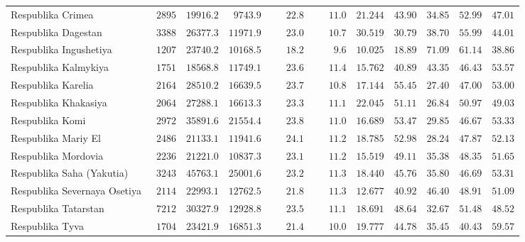 \documentclass[12pt,a4paper]{article}
\numberwithin{equation}{section}
\begin{document}
{\begin{longtable}{lcccccccccc}
		Respublika Crimea  & $\phantom{0}2895$ & $19916.2$ & $\phantom{0}9743.9$ & $\phantom{000}22.8$ & $\phantom{000}11.0$ & $21.244$ & $43.90$ & $34.85$ & $52.99$ & $47.01$ \\
		Respublika Dagestan  & $\phantom{0}3388$ & $26377.3$ & $11971.9$ & $\phantom{000}23.0$ & $\phantom{000}10.7$ & $30.519$ & $30.79$ & $38.70$ & $55.99$ & $44.01$ \\
		Respublika Ingushetiya  & $\phantom{0}1207$ & $23740.2$ & $10168.5$ & $\phantom{000}18.2$ & $\phantom{0000}9.6$ & $10.025$ & $18.89$ & $71.09$ & $61.14$ & $38.86$ \\
		Respublika Kalmykiya  & $\phantom{0}1751$ & $18568.8$ & $11749.1$ & $\phantom{000}23.6$ & $\phantom{000}11.4$ & $15.762$ & $40.89$ & $43.35$ & $46.43$ & $53.57$ \\
		Respublika Karelia  & $\phantom{0}2164$ & $28510.2$ & $16639.5$ & $\phantom{000}23.7$ & $\phantom{000}10.8$ & $17.144$ & $55.45$ & $27.40$ & $47.00$ & $53.00$ \\
		Respublika Khakasiya  & $\phantom{0}2064$ & $27288.1$ & $16613.3$ & $\phantom{000}23.3$ & $\phantom{000}11.1$ & $22.045$ & $51.11$ & $26.84$ & $50.97$ & $49.03$ \\
		Respublika Komi  & $\phantom{0}2972$ & $35891.6$ & $21554.4$ & $\phantom{000}23.8$ & $\phantom{000}11.0$ & $16.689$ & $53.47$ & $29.85$ & $46.67$ & $53.33$ \\
		Respublika Mariy El  & $\phantom{0}2486$ & $21133.1$ & $11941.6$ & $\phantom{000}24.1$ & $\phantom{000}11.2$ & $18.785$ & $52.98$ & $28.24$ & $47.87$ & $52.13$ \\
		Respublika Mordovia  & $\phantom{0}2236$ & $21221.0$ & $10837.3$ & $\phantom{000}23.1$ & $\phantom{000}11.2$ & $15.519$ & $49.11$ & $35.38$ & $48.35$ & $51.65$ \\
		Respublika Saha (Yakutia)  & $\phantom{0}3243$ & $45763.1$ & $25001.6$ & $\phantom{000}23.2$ & $\phantom{000}11.3$ & $18.440$ & $45.76$ & $35.80$ & $46.69$ & $53.31$ \\
		Respublika Severnaya Osetiya  & $\phantom{0}2114$ & $22993.1$ & $12762.5$ & $\phantom{000}21.8$ & $\phantom{000}11.3$ & $12.677$ & $40.92$ & $46.40$ & $48.91$ & $51.09$ \\
		Respublika Tatarstan  & $\phantom{0}7212$ & $30327.9$ & $12928.8$ & $\phantom{000}23.5$ & $\phantom{000}11.1$ & $18.691$ & $48.64$ & $32.67$ & $51.48$ & $48.52$ \\
		Respublika Tyva  & $\phantom{0}1704$ & $23421.9$ & $16851.3$ & $\phantom{000}21.4$ & $\phantom{000}10.0$ & $19.777$ & $44.78$ & $35.45$ & $40.43$ & $59.57$ \\

\end{longtable}}
\end{document}
